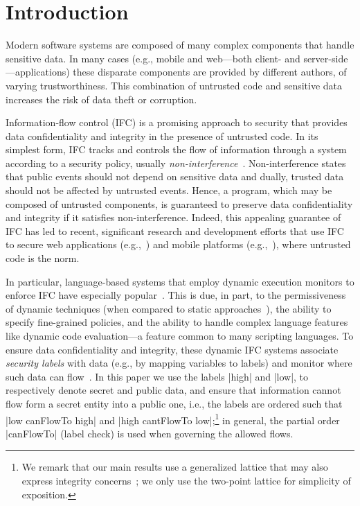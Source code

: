 \section{Introduction}
\label{sec:intro}

Modern software systems are composed of many complex components that
handle sensitive data.
%
In many cases (e.g., mobile and web---both client- and
server-side---applications) these disparate components are provided
by different authors, of varying trustworthiness.
%
This combination of untrusted code and sensitive data 
increases the risk of data theft or corruption.

Information-flow control (IFC) is a promising approach to security
that provides data confidentiality and integrity in the presence of
untrusted code.
%
In its simplest form, IFC tracks and controls the flow of information
through a system according to a security policy, usually
\emph{non-interference}~\cite{Goguen:Meseguer:Noninterference}.
%
Non-interference states that public events should not depend on
sensitive data and dually, trusted data should not be affected by
untrusted events.
%
Hence, a program, which may be composed of untrusted components, is
guaranteed to preserve data confidentiality and integrity if it
satisfies non-interference.
%
Indeed, this appealing guarantee of IFC has led to recent, significant
research and development efforts that use IFC to secure web
applications (e.g.,~\cite{DeGroef:2012:FWB:2382196.2382275,
giffin:hails, yang:2013:towards, Hedin13}) and mobile platforms
(e.g.,~\cite{Enck:2010,android:esorics13}), where untrusted code is
the norm.

In particular, language-based systems that employ dynamic execution
monitors to enforce IFC have especially popular~\cite{Hedin2011}.
%
This is due, in part, to the permissiveness of dynamic techniques
(when compared to static approaches~\cite{Sabelfeld:Russo:PSI09}), the
ability to specify fine-grained policies, and the ability to handle
complex language features like dynamic code evaluation---a feature
common to many scripting languages.
%
To ensure data confidentiality and integrity, these dynamic IFC
systems associate \emph{security labels} with data (e.g., by mapping
variables to labels) and monitor where such data can
flow~\cite{myers:dlm, Stefan:2011}.  
%
In this paper we use the labels |high| and |low|, to respectively
denote secret and public data, and ensure that information cannot flow
form a secret entity into a public one, i.e., the labels are ordered
such that |low canFlowTo high| and |high cantFlowTo low|;\footnote{
  We remark that our main results use a generalized lattice that may
  also express integrity concerns~\cite{myers:dlm, Stefan:2011}; we
  only use the two-point lattice for simplicity of exposition.
}
%
in general, the partial order |canFlowTo| (label check) is used when
governing the allowed flows.
%

